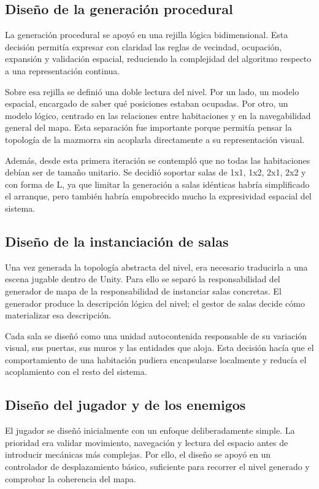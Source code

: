 \subsection{Diseño de la generación procedural}
La generación procedural se apoyó en una rejilla lógica bidimensional. Esta decisión
permitía expresar con claridad las reglas de vecindad, ocupación, expansión y validación
espacial, reduciendo la complejidad del algoritmo respecto a una representación continua.

Sobre esa rejilla se definió una doble lectura del nivel. Por un lado, un modelo espacial,
encargado de saber qué posiciones estaban ocupadas. Por otro, un modelo lógico, centrado
en las relaciones entre habitaciones y en la navegabilidad general del mapa. Esta
separación fue importante porque permitía pensar la topología de la mazmorra sin acoplarla
directamente a su representación visual.

Además, desde esta primera iteración se contempló que no todas las habitaciones debían ser
de tamaño unitario. Se decidió soportar salas de 1x1, 1x2, 2x1, 2x2 y con forma de L, ya
que limitar la generación a salas idénticas habría simplificado el arranque, pero también
habría empobrecido mucho la expresividad espacial del sistema.

\subsection{Diseño de la instanciación de salas}
Una vez generada la topología abstracta del nivel, era necesario traducirla a una escena
jugable dentro de Unity. Para ello se separó la responsabilidad del generador de mapa de la
responsabilidad de instanciar salas concretas. El generador produce la descripción lógica
del nivel; el gestor de salas decide cómo materializar esa descripción.

Cada sala se diseñó como una unidad autocontenida responsable de su variación visual, sus
puertas, sus muros y las entidades que aloja. Esta decisión hacía que el comportamiento de
una habitación pudiera encapsularse localmente y reducía el acoplamiento con el resto del
sistema.

\subsection{Diseño del jugador y de los enemigos}
El jugador se diseñó inicialmente con un enfoque deliberadamente simple. La prioridad era
validar movimiento, navegación y lectura del espacio antes de introducir mecánicas más
complejas. Por ello, el diseño se apoyó en un controlador de desplazamiento básico,
suficiente para recorrer el nivel generado y comprobar la coherencia del mapa.

